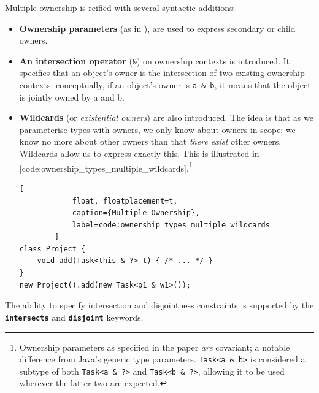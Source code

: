 \documentclass{acm_proc_article-sp}
\begin{document}
\vspace{1ex}
Multiple ownership is reified with several syntactic additions:
\begin{itemize}

    \item \textbf{Ownership parameters} (as in \cite{boyapati04safejava}), are
        used to express secondary or child owners.

    \item \textbf{An intersection operator} (\lstinline|&|) on ownership
        contexts is introduced. It specifies that an object's owner is the
        intersection of two existing ownership contexts: conceptually, if an
        object's owner is \lstinline|a & b|, it means that the object is jointly
        owned by a and b.

    \item \textbf{Wildcards} (or \textit{existential owners}) are also
        introduced. The idea is that as we parameterise types with owners, we
        only know about owners in scope; we know no more about other owners than
        that \textit{there exist} other owners. Wildcards allow us to express
        exactly this. This is illustrated in
        \cref{code:ownership_types_multiple_wildcards}.\footnote{Ownership
        parameters as specified in the paper \textit{are} covariant; a
        notable difference from Java's generic type parameters.
        \lstinline|Task<a & b>| is considered a subtype of both
        \lstinline|Task<a & ?>| and \lstinline|Task<b & ?>|, allowing it to be
        used wherever the latter two are expected.}

        \begin{lstlisting}[
            float, floatplacement=t,
            caption={Multiple Ownership},
            label=code:ownership_types_multiple_wildcards
        ]
class Project {
	void add(Task<this & ?> t) { /* ... */ }
}
new Project().add(new Task<p1 & w1>());
        \end{lstlisting}

\end{itemize}

The ability to specify intersection and disjointness constraints is supported
by the \textbf{\lstinline|intersects|} and \textbf{\lstinline|disjoint|}
keywords.
\end{document}
